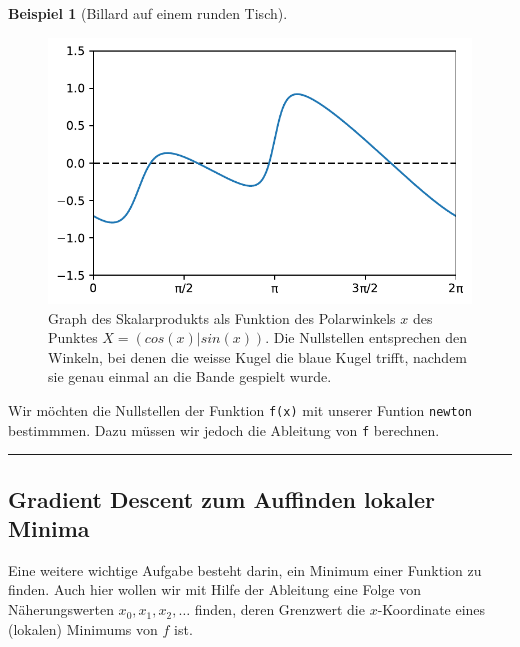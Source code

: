\documentclass[
  letterpaper,
  DIV=11,
  oneside]{scrreprt}
\theoremstyle{definition}
\theoremstyle{definition}
\newtheorem{example}{Beispiel}[chapter]
\theoremstyle{remark}
\begin{document}
\begin{example}[Billard auf einem runden Tisch]
\begin{figure}[H]

{\centering \includegraphics{./intro_files/figure-pdf/fig-graphofbillard-output-1.pdf}

}

\caption{\label{fig-graphofbillard}Graph des Skalarprodukts als Funktion
des Polarwinkels \(x\) des Punktes \(X = (cos(x) | sin(x))\). Die
Nullstellen entsprechen den Winkeln, bei denen die weisse Kugel die
blaue Kugel trifft, nachdem sie genau einmal an die Bande gespielt
wurde.}

\end{figure}

Wir möchten die Nullstellen der Funktion \texttt{f(x)} mit unserer
Funtion \texttt{newton} bestimmmen. Dazu müssen wir jedoch die Ableitung
von \texttt{f} berechnen.

\end{example}

\begin{center}\rule{0.5\linewidth}{0.5pt}\end{center}

\hypertarget{gradient-descent-zum-auffinden-lokaler-minima}{%
\subsection{Gradient Descent zum Auffinden lokaler
Minima}\label{gradient-descent-zum-auffinden-lokaler-minima}}

Eine weitere wichtige Aufgabe besteht darin, ein Minimum einer Funktion
zu finden. Auch hier wollen wir mit Hilfe der Ableitung eine Folge von
Näherungswerten \(x_0, x_1, x_2, \ldots\) finden, deren Grenzwert die
\(x\)-Koordinate eines (lokalen) Minimums von \(f\) ist.
\end{document}
